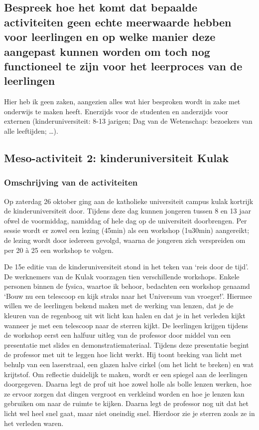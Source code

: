 \documentclass[a4paper,12pt,twoside]{article}%
\begin{document}
	\subsection{Bespreek hoe het komt dat bepaalde activiteiten geen echte meerwaarde hebben voor leerlingen en op welke manier deze aangepast kunnen worden om toch nog functioneel te zijn voor het leerproces van de leerlingen}
	Hier heb ik geen zaken, aangezien alles wat hier besproken wordt in zake met onderwijs te maken heeft. Enerzijds voor de studenten en anderzijds voor externen (kinderuniversiteit: 8-13 jarigen; Dag van de Wetenschap: bezoekers van alle leeftijden; \ldots).


	
	\subsection{Meso-activiteit 2: kinderuniversiteit Kulak}
	\subsubsection{Omschrijving van de activiteiten}  Op zaterdag 26 oktober ging aan de katholieke universiteit campus kulak kortrijk de kinderuniversiteit door. Tijdens deze dag kunnen jongeren tussen 8 en 13 jaar ofwel de voormiddag, namiddag of hele dag op de universiteit doorbrengen. Per sessie wordt er zowel een lezing (45min) als een workshop (1u30min) aangereikt; de lezing wordt door iedereen gevolgd, waarna de jongeren zich verspreiden om per 20 à 25 een workshop te volgen.\newline
	
	
	De 15e editie van de kinderuniversiteit stond in het teken van `reis door de tijd'. De werknemers van de Kulak voorzagen tien verschillende workshops. Enkele personen binnen de fysica, waartoe ik behoor, bedachten een workshop genaamd `Bouw nu een telescoop en kijk straks naar het Universum van vroeger!'. Hiermee willen we de leerlingen bekend maken met de werking van lenzen, dat je de kleuren van de regenboog uit wit licht kan halen en dat je in het verleden kijkt wanneer je met een telescoop naar de sterren kijkt. De leerlingen krijgen tijdens de workshop eerst een halfuur uitleg van de professor door middel van een presentatie met slides en demonstratiemateriaal. Tijdens deze presentatie begint de professor met uit te leggen hoe licht werkt. Hij toont breking van licht met behulp van een laserstraal, een glazen halve cirkel (om het licht te breken) en wat krijtstof. Om reflectie duidelijk te maken, wordt er een spiegel aan de leerlingen doorgegeven. Daarna legt de prof uit hoe zowel holle als bolle lenzen werken, hoe ze ervoor zorgen dat dingen vergroot en verkleind worden en hoe je lenzen kan gebruiken om naar de ruimte te kijken. Daarna legt de professor nog uit dat het licht wel heel snel gaat, maar niet oneindig snel. Hierdoor zie je sterren zoals ze in het verleden waren. \newline\newline
	
\end{document}
